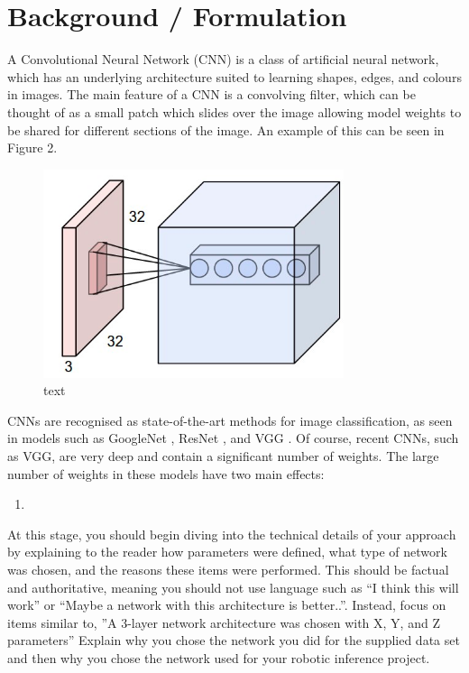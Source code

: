 \documentclass[10pt,journal,compsoc]{IEEEtran}
\begin{document}
		\section{Background / Formulation}
		A Convolutional Neural Network (CNN) is a class of artificial neural network, which has an underlying architecture suited to learning shapes, edges, and colours in images. The main feature of a CNN is a convolving filter, which can be thought of as a small patch which slides over the image allowing model weights to be shared for different sections of the image. An example of this can be seen in Figure 2.\\
		\begin{figure}[h]
			\centering
			\includegraphics[scale=0.4]{CNN}
			\caption{text}
		\end{figure}
		
		CNNs are recognised as state-of-the-art methods for image classification, as seen in models such as GoogleNet \cite{Szegedy:2014}, ResNet \cite{He:2015}, and VGG \cite{Simonyan:2015}. Of course, recent CNNs, such as VGG, are very deep and contain a significant number of weights. The large number of weights in these models have two main effects:
		\begin{enumerate}
			\item 
		\end{enumerate}
		
		
		
		At this stage, you should begin diving into the technical details of your approach by explaining to the reader how parameters were defined, what type of network was chosen, and the reasons these items were performed. This should be factual and authoritative, meaning you should not use language such as “I think this will work” or “Maybe a network with this architecture is better..”. Instead, focus on items similar to, ”A 3-layer network architecture was chosen with X, Y, and Z parameters” 
		Explain why you chose the network you did for the supplied data set and then why you chose the network used for your robotic inference project.
		
\end{document}
